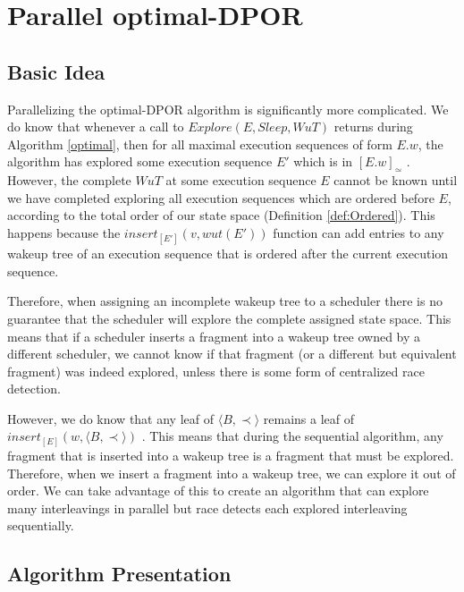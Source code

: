 
\section{Parallel optimal-DPOR}

\subsection{Basic Idea}

Parallelizing the optimal-DPOR algorithm is significantly more complicated. We do know that whenever a call to 
$Explore(E, Sleep, WuT)$ returns during Algorithm \ref{optimal}, then for all maximal execution sequences
of form $E.w$, the algorithm has explored some execution sequence $E'$ which is in $[E.w]_\simeq$ \cite{AbdullaAronisJohnssonSagonasDPOR2014}.
However, the complete $WuT$ at some execution sequence $E$ cannot be known until we have completed
exploring all execution sequences which are ordered before $E$, according to the total order of our state space
(Definition \ref{def:Ordered}). This happens because the $insert_{[E']}(v,wut(E'))$ function can add
entries to any wakeup tree of an execution sequence that is ordered after the current execution sequence.

Therefore, when assigning an incomplete wakeup tree to a scheduler there is no
guarantee that the scheduler will explore the complete assigned state space. This means that if a
scheduler inserts a fragment into a wakeup tree owned by a different scheduler, we cannot know if that 
fragment (or a different but equivalent fragment) was indeed explored, unless there is some form of
centralized race detection.

However, we do know that any leaf of $\langle B , \prec \rangle$ remains a leaf of $insert_{[E]}(w,\langle B , \prec \rangle)$
\cite{AbdullaAronisJohnssonSagonasDPOR2014}. This means that during the sequential algorithm, any fragment that
is inserted into a wakeup tree is a fragment that must be explored. Therefore, when we insert a fragment into a wakeup tree,
we can explore it out of order. We can take advantage of this to create an algorithm that can explore many interleavings in parallel
but race detects each explored interleaving sequentially.

\subsection{Algorithm Presentation}

